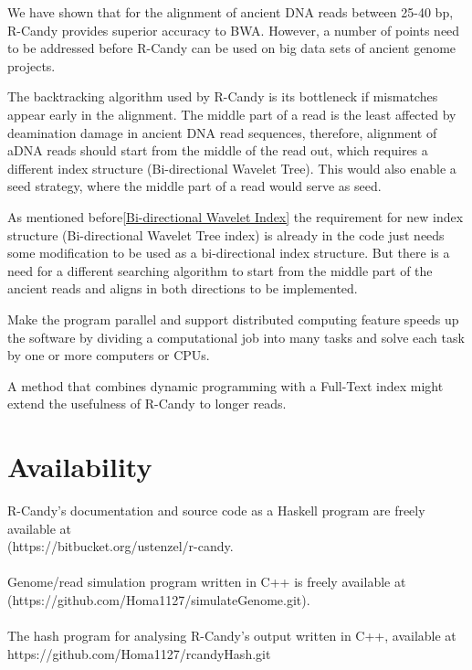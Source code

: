 \documentclass[11pt,a4paper]{report}
\begin{document}
We have shown that for the alignment of ancient DNA reads between 25-40 
bp, R-Candy provides superior accuracy to BWA. However, a number of points 
need to be addressed before R-Candy can be used on big data sets of ancient
genome projects. 


The backtracking algorithm used by R-Candy is its bottleneck if mismatches 
appear early in the alignment. The middle part of a read is the least
affected by deamination damage in ancient DNA read sequences,
therefore, alignment of aDNA reads should start from the middle of the 
read out, which requires a different index structure (Bi-directional Wavelet 
Tree). This would also enable a seed strategy, where the middle part of a read
would serve as seed.

As mentioned before\ref{Bi-directional Wavelet Index} the requirement for new index
structure (Bi-directional Wavelet Tree index) is already in the code just
needs some modification to be used as a bi-directional index structure. 
But there is a need for a different searching algorithm to start from the 
middle part of the ancient reads and aligns in both directions to be implemented.


Make the program parallel and support distributed computing feature
speeds up the software by dividing a computational job into many tasks 
and solve each task by one or more computers or CPUs.

A method that combines dynamic programming with a Full-Text index might 
extend the usefulness of R-Candy to longer reads.

\section{Availability} \label{Availability}

R-Candy's documentation and source code as a Haskell program are freely
available at\\
 (https://bitbucket.org/ustenzel/r-candy.
\\\\
Genome/read simulation program written in C++ is freely available at
(https://github.com/Homa1127/simulateGenome.git).
\\\\
The hash program for analysing R-Candy's output written in C++, available at
https://github.com/Homa1127/rcandyHash.git
\end{document}
